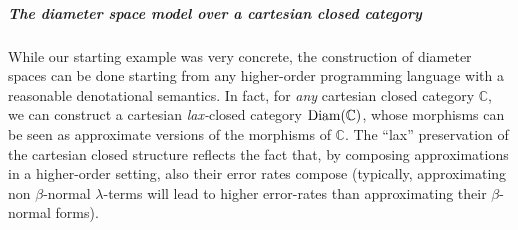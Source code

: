 %
%
%
%
%
%
%
%
%
% 
%
%
%
%
%
%
%





%
\subparagraph*{The diameter space model over a cartesian closed category}
While our starting example was very concrete, the construction of diameter spaces can be 
done starting from any higher-order programming language with a reasonable denotational semantics. In fact, for \emph{any} cartesian closed category $\mathbb C$, we can construct a cartesian \emph{lax-}closed category $\operatorname{Diam}(\mathbb C)$, whose morphisms can be seen as approximate versions  of the morphisms of $\mathbb C$. The ``lax'' preservation of the cartesian closed structure reflects the fact that, by composing approximations in a higher-order setting, also their error rates compose (typically, approximating non $\beta$-normal $\lambda$-terms will lead to higher error-rates than approximating their $\beta$-normal forms). 



